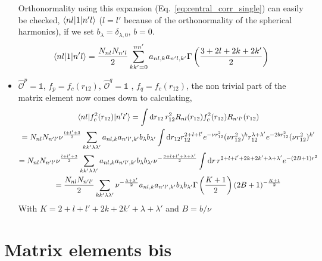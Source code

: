 \documentclass[10pt]{article}
\begin{document}
\begin{itemize}
	Orthonormality using this expansion (Eq.~\ref{eq:central_corr_single}) 
can easily be checked, $\braket{ n l |  1 | n' l}$ ($l=l'$ because of the 
orthonormality of the spherical harmonics), if we set $b_{\lambda} = 
\delta_{\lambda,0}$, $b=0$.
	\begin{align}
		\braket{ n l |  1 | n' l} =  \frac{N_{nl} N_{n'l}}{2}  
\sum_{kk'=0}^{nn'} a_{nl,k} a_{n'l,k'} \Gamma \left( \frac{3+2l+2k + 2k'}{2} 
\right)
	\end{align}
	\item $\hat{\mathcal{O}}^{p} = \mathbb{1}$, $f_{p} = f_c(r_{12})$, 
$\hat{\mathcal{O}}^{q} = \mathbb{1}$ , $f_{q} = f_c(r_{12})$, the non trivial 
part of the matrix element now comes down to calculating,
	\begin{multline*}
		\braket{ n l |  f_{c}^{2}(r_{12}) | n' l'} = \int \text{d} 
r_{12} \, r_{12}^{2} R_{nl}(r_{12}) f_{c}^{2}(r_{12}) R_{n'l'}(r_{12}) \\
		= N_{nl} N_{n'l'} \nu^{\frac{l + l' + 3}{2}} \sum_{kk'\lambda 
\lambda'} a_{nl,k} a_{n'l',k'} b_{\lambda} b_{\lambda'}  \int \text{d} r_{12} 
r_{12}^{2+l+l'} e^{-\nu r_{12}^{2}} ( \nu r_{12}^{2} )^{k} 
r_{12}^{\lambda+\lambda'} e^{-2 b r_{12}^{2}} ( \nu r_{12}^{2})^{k'} \\
		= N_{nl} N_{n'l'} \nu^{\frac{l + l' + 3}{2}} \sum_{kk'\lambda 
\lambda'} a_{nl,k} a_{n'l',k'} b_{\lambda} b_{\lambda'} \nu^{- \frac{3 + l + l' 
+ \lambda + \lambda'}{2}} \int \text{d} r \, r^{2+l+l'+2k+2k'+\lambda + 
\lambda'} e^{- ( 2B + 1) r^{2}} \\
		=  \frac{N_{nl} N_{n'l'}}{2} \sum_{kk'\lambda \lambda'} \nu^{ - 
\frac{\lambda + \lambda'}{2}} a_{nl,k} a_{n'l',k'} b_{\lambda} b_{\lambda'} 
\Gamma\left(\frac{K+1}{2}\right) (2B+1)^{-\frac{K+1}{2}}
	\end{multline*}
	With $K = 2+l+l'+2k+2k'+\lambda+\lambda'$ and $B = b/\nu$
\end{itemize}
\section{Matrix elements bis}
\end{document}
